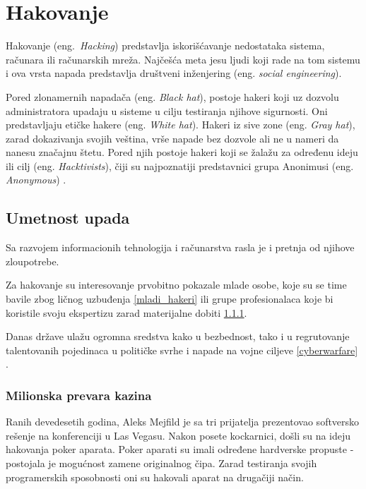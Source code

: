 \documentclass[a4paper]{article}
\begin{document}
\section{Hakovanje}
\label{hakovanje}

Hakovanje (eng.~{\em Hacking}) predstavlja iskorišćavanje nedostataka sistema, računara ili računarskih mreža. Najčešća meta jesu ljudi koji rade na tom sistemu i ova vrsta napada predstavlja društveni inženjering (eng. \textit{social engineering}).

Pored zlonamernih napadača (eng. \textit{Black hat}), postoje hakeri koji uz dozvolu administratora upadaju u sisteme u cilju testiranja njihove sigurnosti. Oni predstavljaju etičke hakere (eng. \textit{White hat}). Hakeri iz sive zone (eng. \textit{Gray hat}), zarad dokazivanja svojih veština, vrše napade bez dozvole ali ne u nameri da nanesu značajnu štetu. Pored njih postoje hakeri koji se žalažu za određenu ideju ili cilj (eng. \textit{Hacktivists}), čiji su najpoznatiji predstavnici grupa Anonimusi (eng. \textit{Anonymous}) \cite{hackers_hat}.
 
\subsection{Umetnost upada}
\label{sec:intrusion}

Sa razvojem informacionih tehnologija i računarstva rasla je i pretnja od njihove zloupotrebe. 

Za hakovanje su interesovanje prvobitno pokazale mlade osobe, koje su se time bavile zbog ličnog uzbuđenja \ref{mladi_hakeri} ili grupe profesionalaca koje bi koristile svoju ekspertizu zarad materijalne dobiti \ref{milionska_prevara_kazina}.

Danas države ulažu ogromna sredstva kako u bezbednost, tako i u regrutovanje talentovanih pojedinaca u političke svrhe i napade na vojne ciljeve \ref{cyberwarfare} \cite{intrusion}.

\subsubsection{Milionska prevara kazina}
\label{milionska_prevara_kazina}

Ranih devedesetih godina, Aleks Mejfild je sa tri prijatelja prezentovao softversko rešenje na konferenciji u Las Vegasu. Nakon posete kockarnici, došli su na ideju hakovanja poker aparata. Poker aparati su imali određene hardverske propuste - postojala je mogućnost zamene originalnog čipa. Zarad testiranja svojih programerskih sposobnosti oni su hakovali aparat na drugačiji način.
\end{document}
